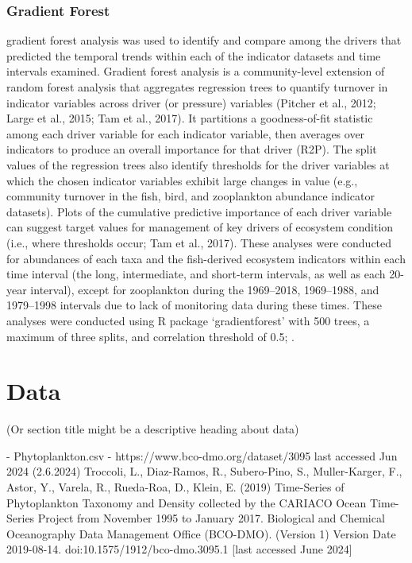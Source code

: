 \documentclass[draft]{agujournal2019}
\begin{document}
    \subsubsection{Gradient Forest}
    gradient forest analysis was used to identify and compare among the drivers that predicted the temporal trends within each of the indicator datasets and time intervals examined. Gradient forest analysis is a community-level extension of random forest analysis that aggregates regression trees to quantify turnover in indicator variables across driver (or pressure) variables (Pitcher et al., 2012; Large et al., 2015; Tam et al., 2017). It partitions a goodness-of-fit statistic among each driver variable for each indicator variable, then averages over indicators to produce an overall importance for that driver (R2P). The split values of the regression trees also identify thresholds for the driver variables at which the chosen indicator variables exhibit large changes in value (e.g., community turnover in the fish, bird, and zooplankton abundance indicator datasets). Plots of the cumulative predictive importance of each driver variable can suggest target values for management of key drivers of ecosystem condition (i.e., where thresholds occur; Tam et al., 2017). These analyses were conducted for abundances of each taxa and the fish-derived ecosystem indicators within each time interval (the long, intermediate, and short-term intervals, as well as each 20-year interval), except for zooplankton during the 1969–2018, 1969–1988, and 1979–1998 intervals due to lack of monitoring data during these times. These analyses were conducted using R package ‘gradientforest’ with 500 trees, a maximum of three splits, and correlation threshold of 0.5; \cite{ellis_gradient_2012}.
            
%
\section{Data} (Or section title might be a descriptive heading about data)
%
%

- Phytoplankton.csv - https://www.bco-dmo.org/dataset/3095
	last accessed Jun 2024 (2.6.2024)
	Troccoli, L., Diaz-Ramos, R., Subero-Pino, S., Muller-Karger, F., Astor, Y., Varela, R., Rueda-Roa, D., Klein, E. (2019) Time-Series of Phytoplankton Taxonomy and Density collected by the CARIACO Ocean Time-Series Project from November 1995 to January 2017. Biological and Chemical Oceanography Data Management Office (BCO-DMO). (Version 1) Version Date 2019-08-14. doi:10.1575/1912/bco-dmo.3095.1 [last accessed June 2024]
\end{document}
